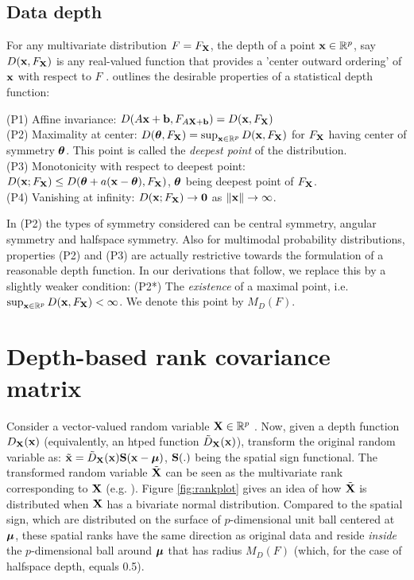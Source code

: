\documentclass[fleqn,12pt]{article}
\begin{document}
\subsection{Data depth}
For any multivariate distribution $F = F_{\mathbf{X}}$, the depth of a point ${\bf{x}} \in \mathbb{R}^p$, say $D({\bf{x}}, F_{\mathbf{X}})$ is any real-valued function that provides a 'center outward ordering' of ${\bf{x}}$ with respect to $F$ \citep{zuo00}. \cite{liu90} outlines the desirable properties of a statistical depth function:

\noindent
(P1) Affine invariance: $D(A{\bf{x}} + {\bf{b}}, F_{A{\mathbf{X}}+{\bf{b}}}) = D({\bf{x}}, F_{\mathbf{X}})$\\
(P2) Maximality at center: $D({\boldsymbol{\theta}}, F_{\mathbf{X}}) = \sup_{{\bf{x}}\in \mathbb{R}^p} D({\bf{x}}, F_{\mathbf{X}})$ for $F_{\mathbf{X}}$ having center of symmetry ${\boldsymbol{\theta}}$. This point is called the \textit{deepest point} of the distribution.\\
(P3) Monotonicity with respect to deepest point: $D({\bf{x}}; F_{\mathbf{X}}) \leq D({\boldsymbol{\theta}} + a({\bf{x}} - {\boldsymbol{\theta}}), F_{\mathbf{X}})$, ${\boldsymbol{\theta}}$ being deepest point of $F_{\mathbf{X}}$.\\
(P4) Vanishing at infinity: $D({\bf{x}}; F_{\mathbf{X}}) \rightarrow \bf0$ as $\|{\bf{x}}\| \rightarrow \infty $.

In (P2) the types of symmetry considered can be central symmetry, angular symmetry and halfspace symmetry. Also for multimodal probability distributions, properties (P2) and (P3) are actually restrictive towards the formulation of a reasonable depth function. In our derivations that follow, we replace this by a slightly weaker condition: (P2*) The \textit{existence} of a maximal point, i.e. $ \sup_{{\bf{x}}\in \mathbb{R}^p} D({\bf{x}}, F_{\mathbf{X}}) < \infty $. We denote this point by $M_D(F)$.

\section{Depth-based rank covariance matrix} \label{section:dcmSection}

Consider a vector-valued random variable ${\mathbf{X}} \in \mathbb{R}^p$ . Now, given a depth function $D_{{\mathbf{X}}}({\bf{x}})$ (equivalently, an htped function $\tilde D_{\mathbf{X}}({\bf{x}})$), transform the original random variable as: $\tilde {{\bf{x}}} = \tilde D_{\mathbf{X}}({\bf{x}}) {\mathbf{S}}({\bf{x}} - {\boldsymbol{\mu}})$, ${\mathbf{S}}(.)$ being the spatial sign functional. The transformed random variable $\tilde {{\mathbf{X}}}$ can be seen as the multivariate rank corresponding to ${\mathbf{X}}$ (e.g. \cite{serfling2006}). Figure \ref{fig:rankplot} gives an idea of how $\tilde {{\mathbf{X}}}$ is distributed when ${\mathbf{X}}$ has a bivariate normal distribution. Compared to the spatial sign, which are distributed on the surface of $p$-dimensional unit ball centered at ${\boldsymbol{\mu}}$, these spatial ranks have the same direction as original data and reside \textit{inside} the $p$-dimensional ball around ${\boldsymbol{\mu}}$ that has radius $M_D(F)$ (which, for the case of halfspace depth, equals 0.5).
\end{document}
